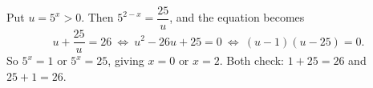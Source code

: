 Put $u=5^x>0$. Then $5^{2-x}=\dfrac{25}{u}$, and the equation becomes
\[
u+\dfrac{25}{u}=26\ \Longleftrightarrow\ u^2-26u+25=0\ \Longleftrightarrow\ (u-1)(u-25)=0 .
\]
So $5^x=1$ or $5^x=25$, giving $\boxed{x=0\text{ or }x=2}$. Both check: $1+25=26$ and $25+1=26$.

